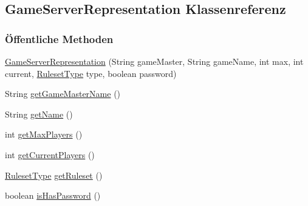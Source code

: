 \hypertarget{a00073}{\subsection{Game\-Server\-Representation Klassenreferenz}
\label{a00073}
}
\subsubsection*{Öffentliche Methoden}
\begin{DoxyCompactItemize}
\item 
\hyperlink{a00073_a27c2eb8bafadf0b25fadc00ec31fcb2d}{Game\-Server\-Representation} (String game\-Master, String game\-Name, int max, int current, \hyperlink{a00066}{Ruleset\-Type} type, boolean password)
\item 
\hypertarget{a00073_a3acba35c72b8d4dcf49579142910672f}{String \hyperlink{a00073_a3acba35c72b8d4dcf49579142910672f}{get\-Game\-Master\-Name} ()}\label{a00073_a3acba35c72b8d4dcf49579142910672f}

\item 
\hypertarget{a00073_a78ee178b6a73658d65ca60da4d1e6683}{String \hyperlink{a00073_a78ee178b6a73658d65ca60da4d1e6683}{get\-Name} ()}\label{a00073_a78ee178b6a73658d65ca60da4d1e6683}

\item 
\hypertarget{a00073_aa019a8bc2bbcb20450ace4f9b481fc34}{int \hyperlink{a00073_aa019a8bc2bbcb20450ace4f9b481fc34}{get\-Max\-Players} ()}\label{a00073_aa019a8bc2bbcb20450ace4f9b481fc34}

\item 
\hypertarget{a00073_a7a85faad49e657892c6d0716c30b43ac}{int \hyperlink{a00073_a7a85faad49e657892c6d0716c30b43ac}{get\-Current\-Players} ()}\label{a00073_a7a85faad49e657892c6d0716c30b43ac}

\item 
\hypertarget{a00073_acc377c72a145354e206375a9c1cf06cb}{\hyperlink{a00066}{Ruleset\-Type} \hyperlink{a00073_acc377c72a145354e206375a9c1cf06cb}{get\-Ruleset} ()}\label{a00073_acc377c72a145354e206375a9c1cf06cb}

\item 
\hypertarget{a00073_acb069a594bda5b57ef2fc5c077d804f4}{boolean \hyperlink{a00073_acb069a594bda5b57ef2fc5c077d804f4}{is\-Has\-Password} ()}\label{a00073_acb069a594bda5b57ef2fc5c077d804f4}

\end{DoxyCompactItemize}
